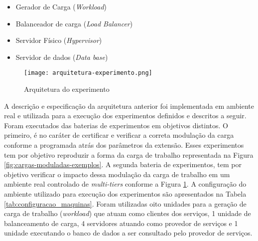 \begin{itemize}
	\item Gerador de Carga (\textit{Workload})
	\item Balanceador de carga (\textit{Load Balancer})
	\item Servidor Físico (\textit{Hypervisor})
	\item Servidor de dados (\textit{Data base})
\end{itemize}

\begin{figure}[!htb]
	\centering
	\texttt{[image: arquitetura-experimento.png]}
	\caption{Arquitetura do experimento}
	\label{fig:arquitetura-experimento}
	\fautor
\end{figure}

A descrição e especificação da arquitetura anterior foi implementada em ambiente real e utilizada para a execução dos experimentos definidos e descritos a seguir.
Foram executados das baterias de experimentos em objetivos distintos. O primeiro, é no caráter de certificar e verificar a correta modulação da carga conforme a programada atrás dos parâmetros da extensão. Esses experimentos tem por objetivo reproduzir a forma da carga de trabalho representada na Figura \ref{fig:cargas-moduladas-exemplos}. A segunda bateria de experimentos, tem por objetivo verificar o impacto dessa modulação da carga de trabalho em um ambiente real controlado de \textit{multi-tiers} conforme a Figura \ref{fig:arquitetura-experimento}. A configuração do ambiente utilizado para execução dos experimentos são apresentados na Tabela \ref{tab:configuracao_maquinas}.
Foram utilizadas oito unidades para a geração de carga de trabalho (\textit{workload}) que atuam como clientes dos serviços, 1 unidade de balanceamento de carga, 4 servidores atuando como provedor de serviços e 1 unidade executando o banco de dados a ser consultado pelo provedor de serviços.

